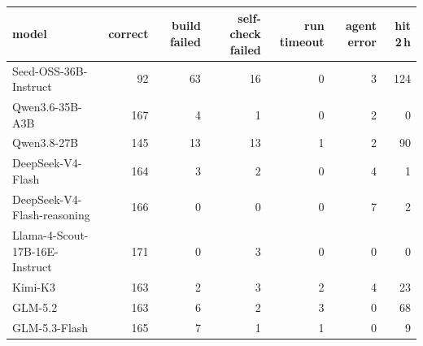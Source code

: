 \begin{tabular}{l r r r r r r}
\toprule
model & correct & build failed & self-check failed & run timeout & agent error & hit 2\,h \\
\midrule
Seed-OSS-36B-Instruct & 92 & 63 & 16 & 0 & 3 & 124 \\
Qwen3.6-35B-A3B & 167 & 4 & 1 & 0 & 2 & 0 \\
Qwen3.8-27B & 145 & 13 & 13 & 1 & 2 & 90 \\
DeepSeek-V4-Flash & 164 & 3 & 2 & 0 & 4 & 1 \\
DeepSeek-V4-Flash-reasoning & 166 & 0 & 0 & 0 & 7 & 2 \\
Llama-4-Scout-17B-16E-Instruct & 171 & 0 & 3 & 0 & 0 & 0 \\
Kimi-K3 & 163 & 2 & 3 & 2 & 4 & 23 \\
GLM-5.2 & 163 & 6 & 2 & 3 & 0 & 68 \\
GLM-5.3-Flash & 165 & 7 & 1 & 1 & 0 & 9 \\
\bottomrule
\end{tabular}
